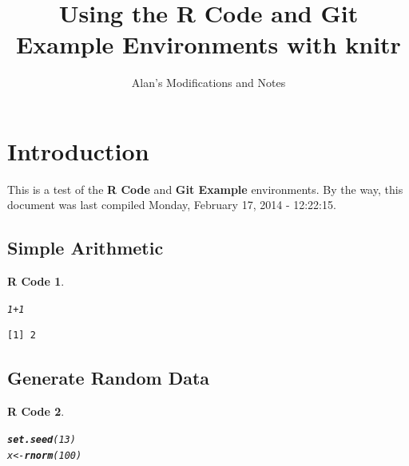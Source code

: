 \documentclass{article}\usepackage[]{graphicx}\usepackage[]{color}
\title{Using the \textbf{R Code} and {\bfseries{Git Example}} Environments with \textbf{knitr}}
\author{Alan's Modifications and Notes}
\makeatletter
\newcommand{\hlnum}[1]{\textcolor[rgb]{0.686,0.059,0.569}{#1}}%
\newcommand{\hlopt}[1]{\textcolor[rgb]{0,0,0}{#1}}%
\newcommand{\hlstd}[1]{\textcolor[rgb]{0.345,0.345,0.345}{#1}}%
\newcommand{\hlkwb}[1]{\textcolor[rgb]{0.69,0.353,0.396}{#1}}%
\newcommand{\hlkwd}[1]{\textcolor[rgb]{0.737,0.353,0.396}{\textbf{#1}}}%
\newenvironment{kframe}{%
 \def\at@end@of@kframe{}%
 \ifinner\ifhmode%
  \def\at@end@of@kframe{\end{minipage}}%
  \begin{minipage}{\columnwidth}%
 \fi\fi%
 \def\FrameCommand##1{\hskip\@totalleftmargin \hskip-\fboxsep
 \colorbox{shadecolor}{##1}\hskip-\fboxsep
     \hskip-\linewidth \hskip-\@totalleftmargin \hskip\columnwidth}%
 \MakeFramed {\advance\hsize-\width
   \@totalleftmargin\z@ \linewidth\hsize
   \@setminipage}}%
 {\par\unskip\endMakeFramed%
 \at@end@of@kframe}
\newenvironment{knitrout}{}{} %
\theoremstyle{rcode}
\newtheorem{rcode}{R Code}[section]
\makeatother
\begin{document}
\maketitle





\section{Introduction}

This is a test of the \textbf{R Code} and \textbf{Git Example} environments.  By the way,
this document was last compiled Monday, February 17, 2014 - 12:22:15.

\subsection{Simple Arithmetic}

\begin{knitrout}
\color{fgcolor}\begin{kframe}
\begin{rcode}\label{test-a}\hfill{}\begin{alltt}
\hlnum{1} \hlopt{+} \hlnum{1}
\end{alltt}
\begin{verbatim}
[1] 2
\end{verbatim}
\end{rcode}\end{kframe}
\end{knitrout}



\subsection{Generate Random Data}

\begin{knitrout}
\color{fgcolor}\begin{kframe}
\begin{rcode}\label{test-b}\hfill{}\begin{alltt}
\hlkwd{set.seed}\hlstd{(}\hlnum{13}\hlstd{)}
\hlstd{x} \hlkwb{<-} \hlkwd{rnorm}\hlstd{(}\hlnum{100}\hlstd{)}
\end{alltt}
\end{rcode}\end{kframe}
\end{knitrout}
\end{document}
